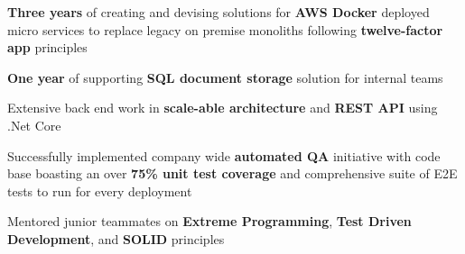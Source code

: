 

\begin{cvparagraph}

\begin{cvitems}
    \item{\textbf{Three years} of creating and devising solutions for \textbf{AWS Docker} deployed micro services to replace legacy on premise monoliths following \textbf{twelve-factor app} principles}
    \item{\textbf{One year} of supporting \textbf{SQL document storage} solution for internal teams}
    \item{Extensive back end work in \textbf{scale-able architecture} and \textbf{REST API} using .Net Core}
    \item{Successfully implemented company wide \textbf{automated QA} initiative with code base boasting an over \textbf{75\% unit test coverage} and comprehensive suite of E2E tests to run for every deployment}
    \item{Mentored junior teammates on \textbf{Extreme Programming}, \textbf{Test Driven Development}}, and \textbf{SOLID} principles
\end{cvitems}
\end{cvparagraph}
